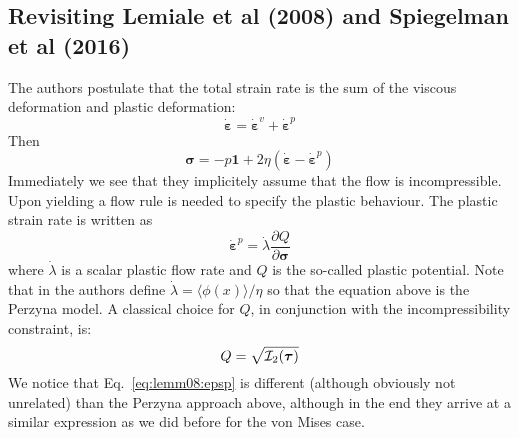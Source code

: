 \subsection{Revisiting Lemiale et al (2008) and Spiegelman et al (2016) }
The authors postulate that the total strain rate is the sum of 
the viscous deformation and plastic deformation:
\[
\dot{\bm \varepsilon} = \dot{\bm \varepsilon}^v + \dot{\bm \varepsilon}^p
\]
Then 
\begin{equation}
\bm \sigma = -p \bm 1 + 2\eta (\dot{\bm \varepsilon} -\dot{\bm \varepsilon}^p)
\label{eq:abcd}
\end{equation}
Immediately we see that they implicitely assume that the flow is incompressible.
Upon yielding a flow rule is needed to specify the plastic 
behaviour. The plastic strain rate is written as
\begin{equation}
\label{eq:lemm08:epsp}
\dot{\bm \varepsilon}^p = \dot\lambda \frac{\partial Q}{\partial \bm\sigma}
\end{equation}
where $\dot\lambda$ is a scalar plastic flow rate and $Q$ is the so-called plastic potential. 
Note that in \textcite{hesd02} the authors define $\dot{\lambda}=\langle \phi(x) \rangle/\eta$
so that the equation above is the Perzyna model. 
A classical choice for $Q$, in conjunction with the incompressibility constraint, is:
\[
Q = \sqrt{ {\cal I}_2(\bm\tau)}
\]
We notice that Eq.~\ref{eq:lemm08:epsp} is different (although obviously not unrelated) 
than the Perzyna approach above, although
in the end they arrive at a similar expression as we did before for the von Mises case.


